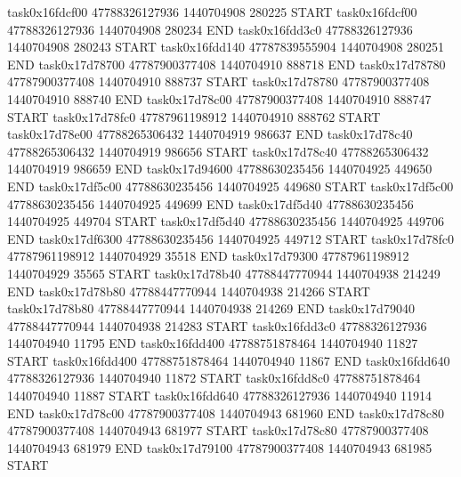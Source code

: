 task0x16fdcf00 47788326127936          1440704908               280225  START
task0x16fdcf00 47788326127936          1440704908               280234  END
task0x16fdd3c0 47788326127936          1440704908               280243  START
task0x16fdd140 47787839555904          1440704908               280251  END
task0x17d78700 47787900377408          1440704910               888718  END
task0x17d78780 47787900377408          1440704910               888737  START
task0x17d78780 47787900377408          1440704910               888740  END
task0x17d78c00 47787900377408          1440704910               888747  START
task0x17d78fc0 47787961198912          1440704910               888762  START
task0x17d78e00 47788265306432          1440704919               986637  END
task0x17d78c40 47788265306432          1440704919               986656  START
task0x17d78c40 47788265306432          1440704919               986659  END
task0x17d94600 47788630235456          1440704925               449650  END
task0x17df5c00 47788630235456          1440704925               449680  START
task0x17df5c00 47788630235456          1440704925               449699  END
task0x17df5d40 47788630235456          1440704925               449704  START
task0x17df5d40 47788630235456          1440704925               449706  END
task0x17df6300 47788630235456          1440704925               449712  START
task0x17d78fc0 47787961198912          1440704929                35518  END
task0x17d79300 47787961198912          1440704929                35565  START
task0x17d78b40 47788447770944          1440704938               214249  END
task0x17d78b80 47788447770944          1440704938               214266  START
task0x17d78b80 47788447770944          1440704938               214269  END
task0x17d79040 47788447770944          1440704938               214283  START
task0x16fdd3c0 47788326127936          1440704940                11795  END
task0x16fdd400 47788751878464          1440704940                11827  START
task0x16fdd400 47788751878464          1440704940                11867  END
task0x16fdd640 47788326127936          1440704940                11872  START
task0x16fdd8c0 47788751878464          1440704940                11887  START
task0x16fdd640 47788326127936          1440704940                11914  END
task0x17d78c00 47787900377408          1440704943               681960  END
task0x17d78c80 47787900377408          1440704943               681977  START
task0x17d78c80 47787900377408          1440704943               681979  END
task0x17d79100 47787900377408          1440704943               681985  START
